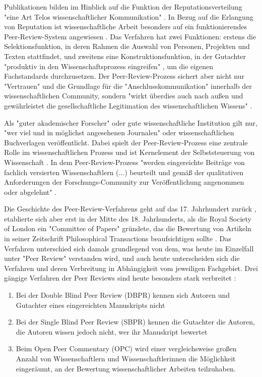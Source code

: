 Publikationen bilden im Hinblick auf die Funktion der Reputationsverteilung "eine Art Telos wissenschaftlicher Kommunikation" \cite{Hirschauer_2004}. In Bezug auf die Erlangung von Reputation ist wissenschaftliche Arbeit besonders auf ein funktionierendes Peer-Review-System angewiesen \cite{Luescher_2014}. Das Verfahren hat zwei Funktionen: erstens die Selektionsfunktion, in deren Rahmen die Auswahl von Personen, Projekten und Texten stattfindet, und zweitens eine Konstruktionsfunktion, in der Gutachter "produktiv in den Wissenschaftsprozess eingreifen" \cite{Neidhardt_2010}, um die eigenen Fachstandards durchzusetzen. Der Peer-Review-Prozess sichert aber nicht nur "Vertrauen" und die Grundlage für die "Anschlusskommunikation" innerhalb der wissenschaftlichen Community, sondern "wirkt überdies auch nach außen und gewährleistet die gesellschaftliche Legitimation des wissenschaftlichen Wissens" \cite[:141]{Pscheida_2010}.

Als "guter akademischer Forscher" oder gute wissenschaftliche Institution gilt nur, "wer viel und in möglichst angesehenen Journalen" \cite{Frey_2005} oder wissenschaftlichen Buchverlagen veröffentlicht. Dabei spielt der Peer-Review-Prozess eine zentrale Rolle im wissenschaftlichen Prozess \cite{Smith_1999a} und ist Kernelement der Selbststeuerung von Wissenschaft \cite[:5]{Neidhardt_2010}. In dem Peer-Review-Prozess "werden eingereichte Beiträge von fachlich versierten Wissenschaftlern (...) beurteilt und gemäß der qualitativen Anforderungen der Forschungs-Community zur Veröffentlichung angenommen oder abgelehnt" \cite{Hess_2006}.

Die Geschichte des Peer-Review-Verfahrens geht auf das 17. Jahrhundert zurück \cite{Kronick_1978}, etablierte sich aber erst in der Mitte des 18. Jahrhunderts, als die Royal Society of London ein "Committee of Papers" gründete, das die Bewertung von Artikeln in seiner Zeitschrift Philosophical Transactions beaufsichtigen sollte \cite{Kronick_1990}. Das Verfahren unterschied sich damals grundlegend von dem, was heute im Einzelfall unter "Peer Review" verstanden wird, und auch heute unterscheiden sich die Verfahren und deren Verbreitung in Abhängigkeit vom jeweiligen Fachgebiet. Drei gängige Verfahren der Peer Reviews sind heute besonders stark verbreitet \cite{Mueller_2009}:
\begin{enumerate}
\item Bei der Double Blind Peer Review (DBPR) kennen sich Autoren und Gutachter eines eingereichten Manuskripts nicht
\item Bei der Single Blind Peer Review (SBPR) kennen die Gutachter die Autoren, die Autoren wissen jedoch nicht, wer ihr Manuskript bewertet
\item Beim Open Peer Commentary (OPC) wird einer vergleichsweise großen Anzahl von Wissenschaftlern und Wissenschaftlerinnen die Möglichkeit eingeräumt, an der Bewertung wissenschaftlicher Arbeiten teilzuhaben.
\end{enumerate}

